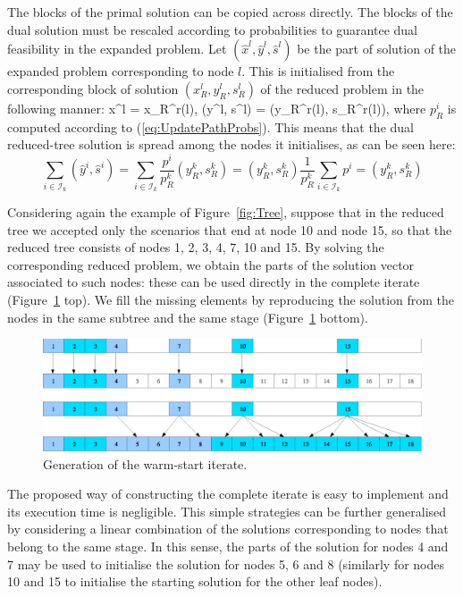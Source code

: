 The blocks of the primal solution can be copied across directly.
The blocks of the dual solution must be rescaled according to probabilities
to guarantee dual feasibility in the expanded problem.
Let $(\hat x^{l}, \hat y^{l}, \hat s^{l})$ be the part of solution
of the expanded problem corresponding to node $l$. This is initialised
from the corresponding block of solution $(x_R^{l}, y_R^{l},  s_R^{l})$
of the reduced problem in the following manner:
\be  \label{eq:WarmstartSolution}
  \hat x^{l} = x_R^{r(l)}, \qquad 
 (\hat y^{l}, \hat s^{l}) =  (y_R^{r(l)}, s_R^{r(l)}),
\ee
where $p^i_R$ is computed according to (\ref{eq:UpdatePathProbs}).
This means that the dual reduced-tree solution is spread among the
nodes it initialises, as can be seen here:
\[
   \sum_{i \in \mathcal{I}_k} (\hat y^i, \hat s^i)
  = \sum_{i \in \mathcal{I}_k} \frac{p^i}{p^k_R} (y^k_R, s^k_R)
  = (y^k_R, s^k_R) \frac{1}{p^k_R} \sum_{i \in \mathcal{I}_k} p^i 
  = (y^k_R, s^k_R)
\]

Considering again the example of Figure~\ref{fig:Tree}, suppose that 
in the reduced tree we accepted only the scenarios that end at 
node 10 and node 15, so that the reduced tree consists of nodes 
1, 2, 3, 4, 7, 10 and 15. By solving the corresponding reduced problem, 
we obtain the parts of the solution vector associated to such 
nodes: these can be used directly in the complete iterate
(Figure~\ref{fig:Solution} top). 
We fill the missing elements 
by reproducing the solution from the nodes in the same subtree 
and the same stage (Figure~\ref{fig:Solution} bottom).
%
\begin{figure}[ht]
  \begin{center}
    \includegraphics[scale=.51]{figures/solution.eps}
    \caption{Generation of the warm-start iterate.}
    \label{fig:Solution}
  \end{center}
  \vspace{-3ex}
\end{figure}

The proposed way of constructing the complete iterate is easy to
implement and its execution time is negligible.
This simple strategies can be further 
generalised by considering a linear combination of the solutions 
corresponding to nodes that belong to the same stage. In this sense, 
the parts of the solution for nodes 4 and 7 may be used to initialise 
the solution for nodes 5, 6 and 8 (similarly for nodes 10 and 15 to 
initialise the starting solution for the other leaf nodes).

